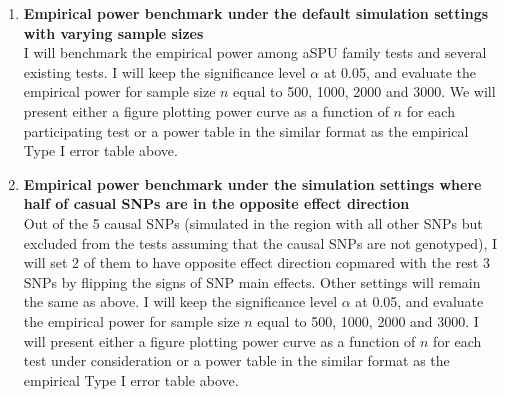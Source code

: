 \documentclass[12pt]{article}
\begin{document}
\begin{enumerate}
\item \textbf{Empirical power benchmark under the default simulation settings with varying sample sizes}\\
I will benchmark the empirical power among aSPU family tests and several existing tests. I will keep the significance level $\alpha$ at 0.05, and evaluate the empirical power for sample size $n$ equal to 500, 1000, 2000 and 3000. We will present either a figure plotting power curve as a function of $n$ for each participating test or a power table in the similar format as the empirical Type I error table above.
%

\item \textbf{Empirical power benchmark under the simulation settings where half of casual SNPs are in the opposite effect direction}\\
Out of the 5 causal SNPs (simulated in the region with all other SNPs but excluded from the tests assuming that the causal SNPs are not genotyped), I will set 2 of them to have opposite effect direction copmared with the rest 3 SNPs by flipping the signs of SNP main effects. Other settings will remain the same as above. I will  keep the significance level $\alpha$ at 0.05, and evaluate the empirical power for sample size $n$ equal to 500, 1000, 2000 and 3000. I will present either a figure plotting power curve as a function of $n$ for each test under consideration or a power table in the similar format as the empirical Type I error table above.


\end{enumerate}
\end{document}
